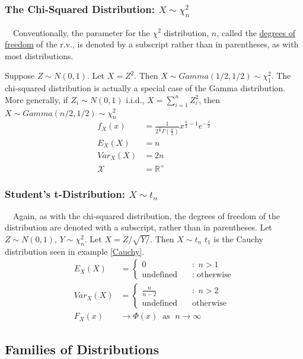 \documentclass[12pt,a4paper]{article}
\begin{document}
\subsubsection{The Chi-Squared Distribution: $X \sim \chi^2_n$}

$\quad$Conventionally, the parameter for the $\chi^2$ distribution, $n$, called the \underline{degrees of freedom} of the r.v., is denoted by a subscript rather than in parentheses, as with most distributions.

Suppose $Z \sim N(0,1)$. Let $X = Z^2$. Then $X \sim Gamma(1\!/\!2,1\!/\!2) \sim \chi^2_1$. The chi-squared distribution is actually a special case of the Gamma distribution. More generally, if $Z_i \sim N(0,1)$ i.i.d., $X = \sum\limits_{i=1}^n Z_i^2$, then $X \sim Gamma(n\!/\!2,1\!/\!2) \sim \chi^2_n$
\begin{align*}
f_X(x) &= \frac{1}{2^{\frac{n}{2}}\Gamma\left(\frac{n}{2}\right)} x^{\frac{n}{2}-1}e^{-\frac{x}{2}}\\
E_{X}(X) &= n\\
Var_{X}(X) &= 2n\\
\mathcal{X} &= \mathbb{R}^+
\end{align*}

\subsubsection{Student's t-Distribution: $ X \sim t_n$}

$\quad$Again, as with the chi-squared distribution, the degrees of freedom of the distribution are denoted with a subscript, rather than in parentheses. Let $Z \sim N(0,1)$, $Y \sim \chi^2_n$. Let $X = Z/\sqrt{Y/}$. Then $X \sim t_n$ $t_1$ is the Cauchy distribution seen in example \ref{Cauchy}.
\begin{align*}
E_{X}(X) &= \left\{ \begin{array}{cl} 0 \quad& : \; n > 1\\ \mbox{undefined}\quad& : \; \mbox{otherwise}\end{array}\right.\\
Var_{X}(X) &= \left\{\begin{array}{cl} \frac{n}{n-2} \quad& : \; n>2\\ \mbox{undefined}\quad& \mbox{otherwise}\end{array}\right.\\
F_X(x) &\rightarrow \Phi(x) \;\; \text{as }\; n\rightarrow \infty
\end{align*}

\subsection{Families of Distributions}$\;$
\end{document}

